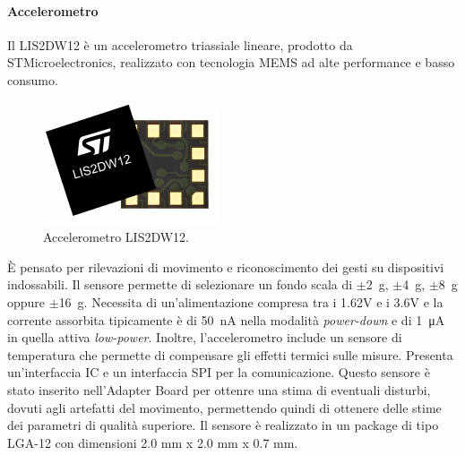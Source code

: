 \paragraph{Accelerometro} Il LIS2DW12 è un accelerometro triassiale lineare, prodotto da STMicroelectronics\cite{STElectronicsLIS2DW12}, realizzato con tecnologia MEMS ad alte performance e basso consumo. 
\begin{figure}[b]
	\centering
	\includegraphics[width=0.3\linewidth]{ImageFiles/Hardware/ImmagineLIS2DW12}
	\caption{Accelerometro LIS2DW12.}
	\label{fig:ImmagineLIS2DW12}
\end{figure}
\`E pensato per rilevazioni di movimento e riconoscimento dei gesti su dispositivi indossabili. Il sensore permette di selezionare un fondo scala di $\pm$\SI{2}{\gram}, $\pm$\SI{4}{\gram}, $\pm$\SI{8}{\gram} oppure $\pm$\SI{16}{\gram}. Necessita di un'alimentazione compresa tra i 1.62V e i 3.6V e la corrente assorbita tipicamente è di \SI{50}{\nano\ampere} nella modalità \textit{power-down} e di \SI{1}{\micro\ampere} in quella attiva \textit{low-power}. Inoltre, l'accelerometro include un sensore di temperatura che permette di compensare gli effetti termici sulle misure. Presenta un'interfaccia IC e un interfaccia SPI per la comunicazione. Questo sensore è stato inserito nell'Adapter Board per ottenre una stima di eventuali disturbi, dovuti agli artefatti del movimento, permettendo quindi di ottenere delle stime dei parametri di qualità superiore. Il sensore è realizzato in un package di tipo LGA-12 con dimensioni 2.0 mm x 2.0 mm x 0.7 mm.
